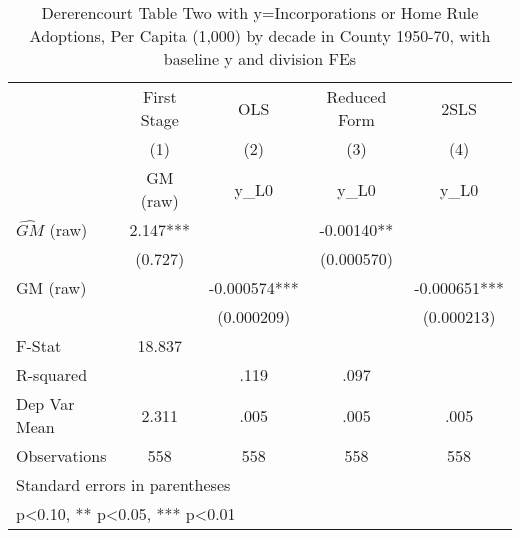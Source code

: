 \begin{table}[htbp]\centering
\def\sym#1{\ifmmode^{#1}\else\(^{#1}\)\fi}
\caption{Dererencourt Table Two with y=Incorporations or Home Rule Adoptions, Per Capita (1,000) by decade in County 1950-70, with baseline y and division FEs}
\begin{tabular}{l*{4}{c}}
\toprule
                    & First Stage   &         OLS   &Reduced Form   &        2SLS   \\
                    &\multicolumn{1}{c}{(1)}&\multicolumn{1}{c}{(2)}&\multicolumn{1}{c}{(3)}&\multicolumn{1}{c}{(4)}\\
                    &\multicolumn{1}{c}{GM  (raw)}&\multicolumn{1}{c}{y\_L0}&\multicolumn{1}{c}{y\_L0}&\multicolumn{1}{c}{y\_L0}\\
\midrule
$\hat{GM}$ (raw)    &       2.147***&               &    -0.00140** &               \\
                    &     (0.727)   &               &  (0.000570)   &               \\
\addlinespace
GM  (raw)           &               &   -0.000574***&               &   -0.000651***\\
                    &               &  (0.000209)   &               &  (0.000213)   \\
\midrule
F-Stat              &      18.837   &               &               &               \\
R-squared           &               &        .119   &        .097   &               \\
Dep Var Mean        &       2.311   &        .005   &        .005   &        .005   \\
Observations        &         558   &         558   &         558   &         558   \\
\bottomrule
\multicolumn{5}{l}{\footnotesize Standard errors in parentheses}\\
\multicolumn{5}{l}{\footnotesize * p<0.10, ** p<0.05, *** p<0.01}\\
\end{tabular}
\end{table}

